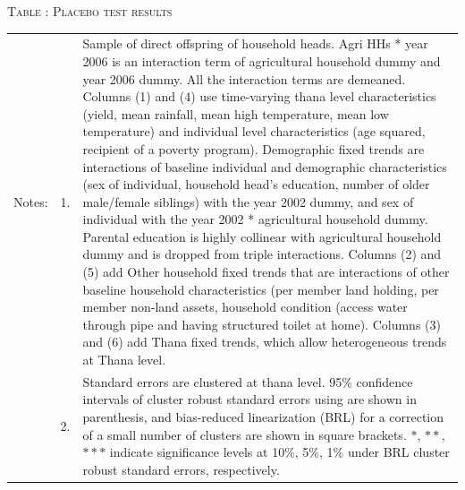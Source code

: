 \documentclass[12pt,letterpaper]{article}
\newcommand{\0}{\ensuremath{\mbox{\boldmath $0$}}}
\begin{document}
\begin{table}
\hfil\textsc{\footnotesize Table \thetable: Placebo test results \label{Placebo10}}\\
\setlength{\tabcolsep}{1pt}
\renewcommand{\arraystretch}{.75}
\hfil
\renewcommand{\arraystretch}{1}
\hfil\begin{tabular}{>{\hfill\scriptsize}p{1cm}<{}>{\hfill\scriptsize}p{.25cm}<{}>{\scriptsize}p{.7\paperwidth}<{\hfill}}
Notes:& 1. & Sample of direct offspring of household heads. \textsf{Agri HHs * year 2006} is an interaction term of agricultural household dummy and year 2006 dummy. All the interaction terms are demeaned. Columns \textsf{(1) and (4)} use time-varying thana level characteristics (yield, mean rainfall, mean high temperature, mean low temperature) and individual level characteristics (age squared, recipient of a poverty program). \textsf{Demographic fixed trends} are interactions of baseline individual and demographic characteristics (sex of individual, household head's education, number of older male/female siblings) with the year 2002 dummy, and sex of individual with the year 2002 * agricultural household dummy. Parental education is highly collinear with agricultural household dummy and is dropped from triple interactions. Columns \textsf{(2) and (5)} add \textsf{Other household fixed trends} that are interactions of other baseline household characteristics (per member land holding, per member non-land assets, household condition (access water through pipe and having structured toilet at home). Columns \textsf{(3) and (6)} add \textsf{Thana fixed trends}, which allow heterogeneous trends at Thana level. \\[-1ex]
& 2. & Standard errors are clustered at thana level. 95\% confidence intervals of cluster robust standard errors using \cite{liang1986longitudinal} are shown in parenthesis, and bias-reduced linearization (BRL) for a correction of a small number of clusters are shown in square brackets. $*$, $**$, $***$ indicate significance levels at 10\%, 5\%, 1\% under BRL cluster robust standard errors, respectively.
\end{tabular}
\end{table}
\end{document}
